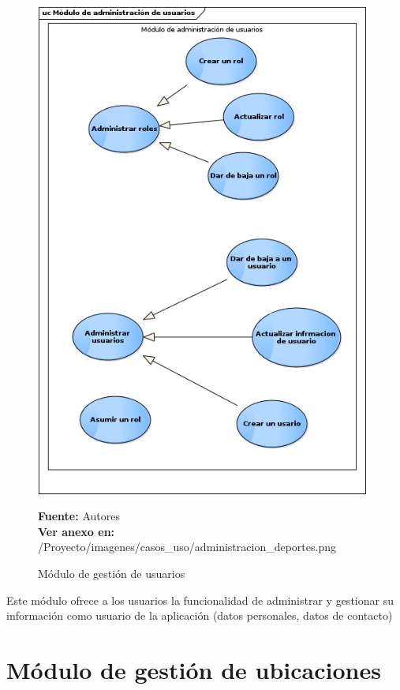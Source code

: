 \begin{figure}[!htb]
  \begin{center}
    \includegraphics[width=11cm]{./imagenes/casos_uso/gestion_usuarios.png}
    \caption{Módulo de gestión de usuarios}
    \label{fig:cu_usuarios}
    \textbf{Fuente:} Autores \\
    \textbf{Ver anexo en:} /Proyecto/imagenes/casos\_uso/administracion\_deportes.png
  \end{center}
\end{figure}

Este módulo ofrece a los usuarios la funcionalidad de administrar y gestionar su información como usuario de la aplicación (datos personales, datos de contacto)

\section{Módulo de gestión de ubicaciones}

